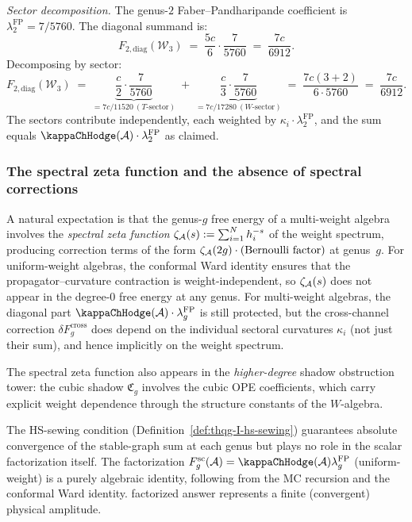 \begin{computation}
\emph{Sector decomposition.} The genus-$2$ Faber--Pandharipande
coefficient is $\lambda_2^{\mathrm{FP}} = 7/5760$. The
diagonal summand is:
\[
F_{2,\mathrm{diag}}(\mathcal{W}_3) \;=\; \frac{5c}{6} \cdot \frac{7}{5760}
\;=\; \frac{7c}{6912}.
\]
Decomposing by sector:
\[
F_{2,\mathrm{diag}}(\mathcal{W}_3) \;=\;
\underbrace{\frac{c}{2} \cdot \frac{7}{5760}}_{\displaystyle
 = 7c/11520\ (T\text{-sector})}
\;+\;
\underbrace{\frac{c}{3} \cdot \frac{7}{5760}}_{\displaystyle
 = 7c/17280\ (W\text{-sector})}
\;=\; \frac{7c(3+2)}{6 \cdot 5760}
\;=\; \frac{7c}{6912}.
\]
The sectors contribute independently, each weighted by
$\kappa_i \cdot \lambda_2^{\mathrm{FP}}$, and the sum equals
$\kappaChHodge(\cA) \cdot \lambda_2^{\mathrm{FP}}$ as claimed.
\end{computation}

\subsubsection{The spectral zeta function and the absence of
spectral corrections}

\begin{remark}
\label{rem:no-spectral-zeta}
A natural expectation is that the genus-$g$ free energy of a
multi-weight algebra involves the \emph{spectral zeta function}
$\zeta_{\mathcal{A}}(s) := \sum_{i=1}^N h_i^{-s}$ of the weight
spectrum, producing correction terms of the form
$\zeta_{\mathcal{A}}(2g) \cdot (\text{Bernoulli factor})$ at genus~$g$.
For uniform-weight algebras, the conformal Ward identity ensures
that the propagator--curvature contraction is weight-independent,
so $\zeta_{\mathcal{A}}(s)$ does not appear in the degree-$0$ free energy
at any genus. For multi-weight algebras, the diagonal part
$\kappaChHodge(\cA) \cdot \lambda_g^{\mathrm{FP}}$ is still protected, but
the cross-channel correction $\delta F_g^{\mathrm{cross}}$
does depend on the individual sectoral curvatures
$\kappa_i$ \textup{(}not just their sum\textup{)}, and hence
implicitly on the weight spectrum.

The spectral zeta function also appears in the
\emph{higher-degree} shadow obstruction tower: the cubic shadow
$\mathfrak{C}_g$ involves the cubic OPE coefficients, which
carry explicit weight dependence through the structure constants
of the $W$-algebra.
\end{remark}

\begin{remark}
\label{rem:hs-sewing-factorization}
The HS-sewing condition
(Definition~\ref{def:thqg-I-hs-sewing}) guarantees absolute
convergence of the stable-graph sum at each genus but plays no
role in the scalar factorization itself. The factorization
$F_g^{\mathrm{sc}}(\cA)=\kappaChHodge(\cA)\lambda_g^{\mathrm{FP}}$
\textup{(}uniform-weight\textup{)} is a purely
algebraic identity, following from the MC recursion and the
conformal Ward identity. %
factorized answer represents a finite (convergent) physical
amplitude.
\end{remark}

